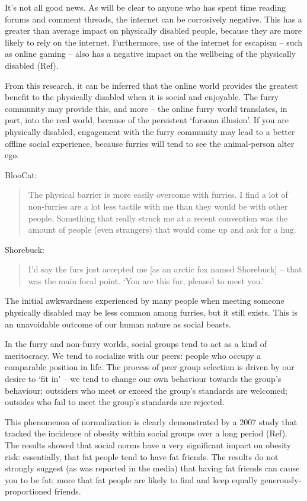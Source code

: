 It's not all good news. As will be clear to anyone who has spent time reading forums and comment threads, the internet can be corrosively negative. This has a greater than average impact on physically disabled people, because they are more likely to rely on the internet. Furthermore, use of the internet for escapism -- such as online gaming -- also has a negative impact on the wellbeing of the physically disabled (Ref).

From this research, it can be inferred that the online world provides the greatest benefit to the physically disabled when it is social and enjoyable. The furry community may provide this, and more -- the online furry world translates, in part, into the real world, because of the persistent `fursona illusion'. If you are physically disabled, engagement with the furry community may lead to a better offline social experience, because furries will tend to see the animal-person alter ego.

BlooCat:

\begin{quote}
  The physical barrier is more easily overcome with furries. I find a lot of non-furries are a lot less tactile with me than they would be with other people. Something that really struck me at a recent convention was the amount of people (even strangers) that would come up and ask for a hug.
\end{quote}

Shorebuck:

\begin{quote}
  I'd say the furs just accepted me [as an arctic fox named Shorebuck] -- that was the main focal point. `You are this fur, pleased to meet you.'
\end{quote}

The initial awkwardness experienced by many people when meeting someone physically disabled may be less common among furries, but it still exists. This is an unavoidable outcome of our human nature as social beasts.

In the furry and non-furry worlds, social groups tend to act as a kind of meritocracy. We tend to socialize with our peers: people who occupy a comparable position in life. The process of peer group selection is driven by our desire to `fit in' -- we tend to change our own behaviour towards the group's behaviour; outsiders who meet or exceed the group's standards are welcomed; outsides who fail to meet the group's standards are rejected.

This phenomenon of normalization is clearly demonstrated by a 2007 study that tracked the incidence of obesity within social groups over a long period (Ref). The results showed that social norms have a very significant impact on obesity risk: essentially, that fat people tend to have fat friends. The results do not strongly suggest (as was reported in the media) that having fat friends can cause you to be fat; more that fat people are likely to find and keep equally generously-proportioned friends.

